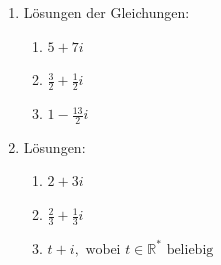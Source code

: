 \begin{enumerate}
 
\item Lösungen der Gleichungen:
\begin{enumerate}
    \item $5 + 7i$
    \item $\frac{3}{2} + \frac{1}{2}i$
    \item $1 - \frac{13}{2}i$
\end{enumerate}

\item Lösungen:
\begin{enumerate}
    \item $2 + 3i$
    \item $\frac{2}{3} + \frac{1}{3}i$
    \item $t + i, \text{ wobei } t \in \mathbb{R}^* \text{ beliebig}$
   
\end{enumerate}
\end{enumerate}
















\clearpage
